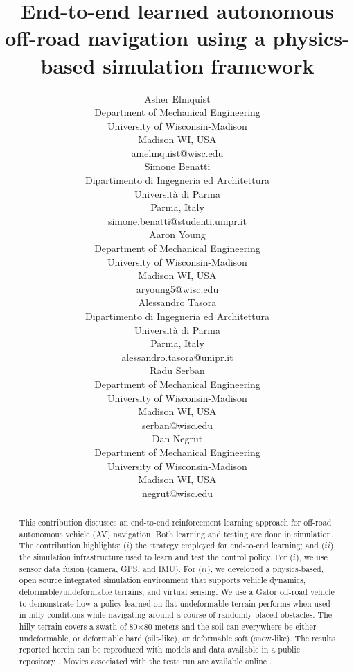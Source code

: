 \documentclass{article}
\title{End-to-end learned autonomous off-road navigation using a physics-based simulation framework}
\author{
  Asher Elmquist \\
  Department of Mechanical Engineering \\
  University of Wisconsin-Madison \\
  Madison WI, USA \\
  amelmquist@wisc.edu \\
  \And
  Simone Benatti \\
  Dipartimento di Ingegneria ed Architettura \\
  Università di Parma \\
  Parma, Italy \\
  simone.benatti@studenti.unipr.it \\
  \And
  Aaron Young \\
  Department of Mechanical Engineering \\
  University of Wisconsin-Madison \\
  Madison WI, USA \\
  aryoung5@wisc.edu \\
  \And
  Alessandro Tasora \\
  Dipartimento di Ingegneria ed Architettura \\
  Università di Parma \\
  Parma, Italy \\
  alessandro.tasora@unipr.it \\
  \And
  Radu Serban \\
  Department of Mechanical Engineering \\
  University of Wisconsin-Madison \\
  Madison WI, USA \\
  serban@wisc.edu \\
  \And
  Dan Negrut  \\
  Department of Mechanical Engineering \\
  University of Wisconsin-Madison \\
  Madison WI, USA \\
  negrut@wisc.edu \\
}
\begin{document}
\maketitle


\begin{abstract}
This contribution discusses an end-to-end reinforcement learning approach for off-road autonomous vehicle (AV) navigation. Both learning and testing are done in simulation. The contribution highlights: ($i$) the strategy employed for end-to-end learning; and ($ii$) the simulation infrastructure used to learn and test the control policy. For ($i$), we use sensor data fusion (camera, GPS, and IMU). For ($ii$), we developed a physics-based, open source integrated simulation environment that supports vehicle dynamics, deformable/undeformable terrains, and virtual sensing. We use a Gator off-road vehicle to demonstrate how a policy learned on flat undeformable terrain performs when used in hilly conditions while navigating around a course of randomly placed obstacles. The hilly terrain covers a swath of 80$ \times $80 meters and the soil can everywhere be either undeformable, or deformable hard (silt-like), or deformable soft (snow-like). The results reported herein can be reproduced with models and data available in a public repository \cite{CoRLsupportData2020}. Movies associated with the tests run are available online  \cite{CoRLpaperVideos2020}.

\end{abstract}


\end{document}
